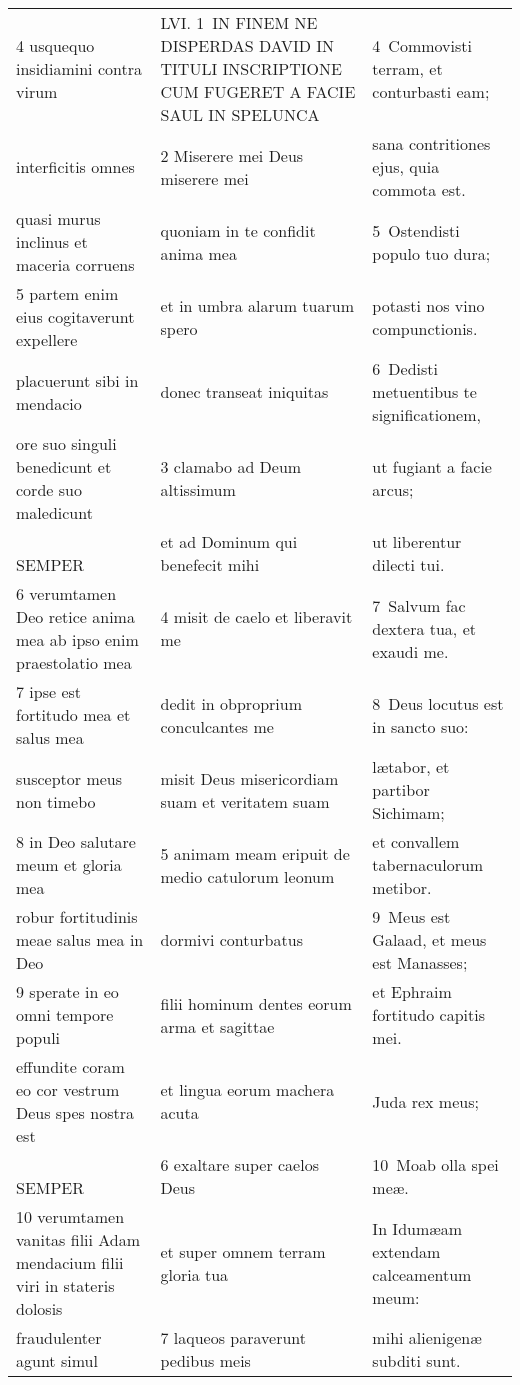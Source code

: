 \documentclass{article}
\begin{document}
\begin{longtable}{@{}p{}p{}p{}@{}}
4 usquequo insidiamini contra virum	&	LVI. 1 IN FINEM NE DISPERDAS DAVID IN TITULI INSCRIPTIONE CUM FUGERET A FACIE SAUL IN SPELUNCA	&	4 Commovisti terram, et conturbasti eam;	\\
interficitis omnes	&	2 Miserere mei Deus miserere mei	&	sana contritiones ejus, quia commota est.	\\
quasi murus inclinus et maceria corruens	&	quoniam in te confidit anima mea	&	5 Ostendisti populo tuo dura;	\\
5 partem enim eius cogitaverunt expellere	&	et in umbra alarum tuarum spero	&	potasti nos vino compunctionis.	\\
placuerunt sibi in mendacio	&	donec transeat iniquitas	&	6 Dedisti metuentibus te significationem,	\\
ore suo singuli benedicunt et corde suo maledicunt	&	3 clamabo ad Deum altissimum	&	ut fugiant a facie arcus;	\\
    SEMPER	&	et ad Dominum qui benefecit mihi	&	ut liberentur dilecti tui.	\\
6 verumtamen Deo retice anima mea ab ipso enim praestolatio mea	&	4 misit de caelo et liberavit me	&	7 Salvum fac dextera tua, et exaudi me.	\\
7 ipse est fortitudo mea et salus mea	&	dedit in obproprium conculcantes me	&	8 Deus locutus est in sancto suo:	\\
susceptor meus non timebo	&	misit Deus misericordiam suam et veritatem suam	&	lætabor, et partibor Sichimam;	\\
8 in Deo salutare meum et gloria mea	&	5 animam meam eripuit de medio catulorum leonum	&	et convallem tabernaculorum metibor.	\\
robur fortitudinis meae salus mea in Deo	&	dormivi conturbatus	&	9 Meus est Galaad, et meus est Manasses;	\\
9 sperate in eo omni tempore populi	&	filii hominum dentes eorum arma et sagittae	&	et Ephraim fortitudo capitis mei.	\\
effundite coram eo cor vestrum Deus spes nostra est	&	et lingua eorum machera acuta	&	Juda rex meus;	\\
    SEMPER	&	6 exaltare super caelos Deus	&	10 Moab olla spei meæ.	\\
10 verumtamen vanitas filii Adam mendacium filii viri in stateris dolosis	&	et super omnem terram gloria tua	&	In Idumæam extendam calceamentum meum:	\\
fraudulenter agunt simul	&	7 laqueos paraverunt pedibus meis	&	mihi alienigenæ subditi sunt.	\\

\end{longtable}
\end{document}
